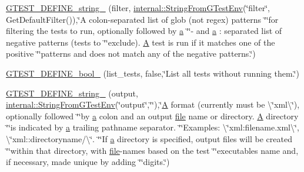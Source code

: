 \begin{DoxyCompactItemize}
\item 
\hyperlink{namespacetesting_aa7039e72c7b7041f11d2619c93a934d6}{G\+T\+E\+S\+T\+\_\+\+D\+E\+F\+I\+N\+E\+\_\+string\+\_\+} (filter, \hyperlink{namespacetesting_1_1internal_ac54dabc540bf79c2de91add679bfb93b}{internal\+::\+String\+From\+G\+Test\+Env}(\char`\"{}filter\char`\"{}, Get\+Default\+Filter()),\char`\"{}A colon-\/separated list of glob (not regex) patterns \char`\"{}\char`\"{}for filtering the tests to run, optionally followed by \hyperlink{_07copy_08_2_read_camera_model_8m_a551a3d351eadcc0b9b1a2f24f0fb5ea0}{a} \char`\"{}\char`\"{}\textquotesingle{}-\/\textquotesingle{} and \hyperlink{_07copy_08_2_read_camera_model_8m_a551a3d351eadcc0b9b1a2f24f0fb5ea0}{a} \+: separated list of negative patterns (tests to \char`\"{}\char`\"{}exclude).  \hyperlink{namespacetesting_a5e9134d655d2fc9323902348083282e7}{A} test is run if it matches one of the positive \char`\"{}\char`\"{}patterns and does not match any of the negative patterns.\char`\"{})
\item 
\hyperlink{namespacetesting_a9ef54a5b29ac4b2a1e086e77224a0b19}{G\+T\+E\+S\+T\+\_\+\+D\+E\+F\+I\+N\+E\+\_\+bool\+\_\+} (list\+\_\+tests, false,\char`\"{}List all tests without running them.\char`\"{})
\item 
\hyperlink{namespacetesting_a9f8de43b364103bafa1e8ca4bebe9d58}{G\+T\+E\+S\+T\+\_\+\+D\+E\+F\+I\+N\+E\+\_\+string\+\_\+} (output, \hyperlink{namespacetesting_1_1internal_ac54dabc540bf79c2de91add679bfb93b}{internal\+::\+String\+From\+G\+Test\+Env}(\char`\"{}output\char`\"{},\char`\"{}\char`\"{}),\char`\"{}\hyperlink{namespacetesting_a5e9134d655d2fc9323902348083282e7}{A} format (currently must be \textbackslash{}\char`\"{}xml\textbackslash{}\char`\"{}), optionally followed \char`\"{}\char`\"{}by \hyperlink{_07copy_08_2_read_camera_model_8m_a551a3d351eadcc0b9b1a2f24f0fb5ea0}{a} colon and an output \hyperlink{_07copy_08_2_read_camera_model_8m_a151631b2fd2bb776ef06c9f440a7ed74}{file} name or directory. \hyperlink{namespacetesting_a5e9134d655d2fc9323902348083282e7}{A} directory \char`\"{}\char`\"{}is indicated by \hyperlink{_07copy_08_2_read_camera_model_8m_a551a3d351eadcc0b9b1a2f24f0fb5ea0}{a} trailing pathname separator. \char`\"{}\char`\"{}Examples\+: \textbackslash{}\char`\"{}xml\+:filename.\+xml\textbackslash{}\char`\"{}, \textbackslash{}\char`\"{}xml\+::directoryname/\textbackslash{}\char`\"{}. \char`\"{}\char`\"{}If \hyperlink{_07copy_08_2_read_camera_model_8m_a551a3d351eadcc0b9b1a2f24f0fb5ea0}{a} directory is specified, output files will be created \char`\"{}\char`\"{}within that directory, with \hyperlink{_07copy_08_2_read_camera_model_8m_a151631b2fd2bb776ef06c9f440a7ed74}{file}-\/names based on the test \char`\"{}\char`\"{}executable\textquotesingle{}s name and, if necessary, made unique by adding \char`\"{}\char`\"{}digits.\char`\"{})

\end{DoxyCompactItemize}
